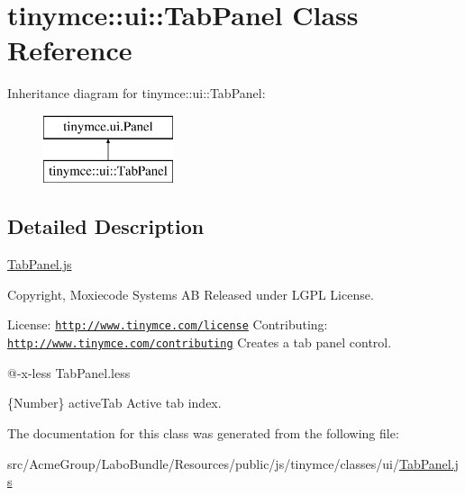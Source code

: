 \hypertarget{classtinymce_1_1ui_1_1_tab_panel}{\section{tinymce\+:\+:ui\+:\+:Tab\+Panel Class Reference}
\label{classtinymce_1_1ui_1_1_tab_panel}
}
Inheritance diagram for tinymce\+:\+:ui\+:\+:Tab\+Panel\+:\begin{figure}[H]
\begin{center}
\leavevmode
\includegraphics[height=2.000000cm]{classtinymce_1_1ui_1_1_tab_panel}
\end{center}
\end{figure}


\subsection{Detailed Description}
\hyperlink{_tab_panel_8js}{Tab\+Panel.\+js}

Copyright, Moxiecode Systems A\+B Released under L\+G\+P\+L License.

License\+: \href{http://www.tinymce.com/license}{\tt http\+://www.\+tinymce.\+com/license} Contributing\+: \href{http://www.tinymce.com/contributing}{\tt http\+://www.\+tinymce.\+com/contributing} Creates a tab panel control.

@-\/x-\/less Tab\+Panel.\+less

\{Number\} active\+Tab Active tab index. 

The documentation for this class was generated from the following file\+:\begin{DoxyCompactItemize}
\item 
src/\+Acme\+Group/\+Labo\+Bundle/\+Resources/public/js/tinymce/classes/ui/\hyperlink{_tab_panel_8js}{Tab\+Panel.\+js}\end{DoxyCompactItemize}
